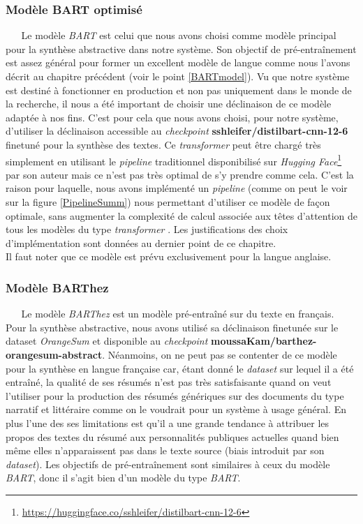 \subsubsection{Modèle BART optimisé}
$ _{} $ $ _{} $ $ _{} $ $ _{} $ $ _{} $Le modèle \textit{BART} \cite{BART} est celui que nous avons choisi comme modèle principal pour la synthèse abstractive dans notre système. Son objectif de pré-entraînement est assez général pour former un excellent modèle de langue comme nous l'avons décrit au chapitre précédent (voir le point \ref{BARTmodel}). Vu que notre système est destiné à fonctionner en production et non pas uniquement dans le monde de la recherche, il nous a été important de choisir une déclinaison de ce modèle adaptée à nos fins. C'est pour cela que nous avons choisi, pour notre système, d'utiliser la déclinaison accessible au \textit{checkpoint} \textbf{sshleifer/distilbart-cnn-12-6} finetuné pour la synthèse des textes. Ce \textit{transformer} peut être chargé très sim\-ple\-ment en utilisant le \textit{pipeline} traditionnel disponibilisé sur \textit{Hugging Face}\footnote{\href{https://huggingface.co/sshleifer/distilbart-cnn-12-6}{https://huggingface.co/sshleifer/distilbart-cnn-12-6}} par son auteur mais ce n'est pas très optimal de s'y prendre comme cela. C'est la raison pour laquelle, nous avons implémenté un \textit{pipeline} (comme on peut le voir sur la figure \ref{PipelineSumm}) nous permettant d'utiliser ce modèle de façon optimale, sans augmenter la complexité de calcul associée aux têtes d'attention de tous les modèles du type \textit{transformer} \cite{vaswani2017attention}. Les justifications des choix d'implémentation sont données au dernier point de ce chapitre.\\
Il faut noter que ce modèle est prévu exclusivement pour la langue anglaise.
\subsubsection{Modèle BARThez}
$ _{} $ $ _{} $ $ _{} $ $ _{} $ $ _{} $Le modèle \textit{BARThez} \cite{eddine2020barthez} est un modèle pré-entraîné sur du texte en français. Pour la synthèse abstractive, nous avons utilisé sa déclinaison finetunée sur le dataset \textit{OrangeSum} et disponible au \textit{checkpoint} \textbf{moussaKam/barthez-orangesum-abstract}. Néanmoins, on ne peut pas se contenter de ce modèle pour la synthèse en langue française car, étant donné le \textit{dataset} sur lequel il a été entraîné, la qualité de ses résumés n'est pas très satisfaisante quand on veut l'utiliser pour la production des résumés génériques sur des documents du type narratif et littéraire comme on le voudrait pour un système à usage général. En plus l'une des ses limitations est qu'il a une grande tendance à attribuer les propos des textes du résumé aux personnalités publiques actuelles quand bien même elles n'apparaissent pas dans le texte source (biais introduit par son \textit{dataset}). Les objectifs de pré-entraînement sont similaires à ceux du modèle \textit{BART}, donc il s'agit bien d'un modèle du type \textit{BART}. 

